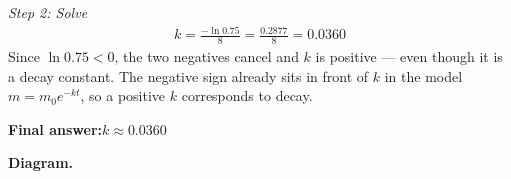 \documentclass[11pt]{article}
\begin{document}
\textit{Step 2: Solve}
\[\begin{gathered}
k = \frac{-\ln 0.75}{8} = \frac{0.2877}{8} = 0.0360
\end{gathered}\]
Since \( \ln 0.75 < 0 \), the two negatives cancel and \( k \) is positive --- even though it is a decay constant. The negative sign already sits in front of \( k \) in the model \( m = m_0 e^{-kt} \), so a positive \( k \) corresponds to decay.

\begin{answerbox}
\textbf{Final answer:}\quad \(\displaystyle  k \approx 0.0360 \)
\end{answerbox}
\textbf{Diagram.}

\begin{center}
\end{center}
\end{document}
